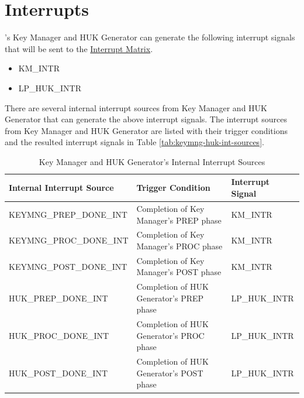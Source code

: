 \documentclass[main\_\_EN.tex]{subfiles}
\begin{document}

\section{Interrupts}

\chipname{}'s Key Manager and HUK Generator can generate the following interrupt signals that will be sent to the \hyperref[mod:intmtrx]{Interrupt Matrix}.

    \begin{itemize}
        \item KM\_INTR
        \item LP\_HUK\_INTR
    \end{itemize}

There are several internal interrupt sources from Key Manager and HUK Generator that can generate the above interrupt signals. The interrupt sources from Key Manager and HUK Generator are listed with their trigger conditions and the resulted interrupt signals in Table \ref{tab:keymng-huk-int-sources}.

\begin{longtable}{ | L{4.5cm} | L{8cm} | L{3cm} | }
\caption{Key Manager and HUK Generator's Internal Interrupt Sources} \label{tab:keymng-huk-int-sources}
\\ \hline
{}
\textbf{Internal Interrupt Source} & \textbf{Trigger Condition}  &  \textbf{Interrupt Signal}\\ \hline
\label{int:KEYMNGPREPDONEINT}KEYMNG\_PREP\_DONE\_INT  &  Completion of Key Manager's PREP phase &  KM\_INTR  \\ \hline
\label{int:KEYMNGPROCDONEINT}KEYMNG\_PROC\_DONE\_INT  &  Completion of Key Manager's PROC phase &  KM\_INTR  \\ \hline
\label{int:KEYMNGPOSTDONEINT}KEYMNG\_POST\_DONE\_INT  &  Completion of Key Manager's POST phase &  KM\_INTR  \\ \hline
\label{int:HUKPREPDONEINT}HUK\_PREP\_DONE\_INT  &  Completion of HUK Generator's PREP phase &  LP\_HUK\_INTR  \\ \hline
\label{int:HUKPROCDONEINT}HUK\_PROC\_DONE\_INT  &  Completion of HUK Generator's PROC phase &  LP\_HUK\_INTR  \\ \hline
\label{int:HUKPOSTDONEINT}HUK\_POST\_DONE\_INT  &  Completion of HUK Generator's POST phase &  LP\_HUK\_INTR  \\ \hline
\end{longtable}
\end{document}
